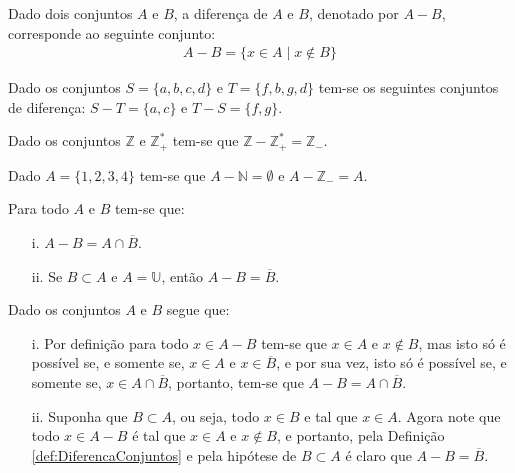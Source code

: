 \begin{definicao}\label{def:DiferencaConjuntos}
	Dado dois conjuntos $A$ e $B$, a diferença de $A$ e $B$, denotado por $A - B$, corresponde ao seguinte conjunto:
  \begin{eqnarray*}
    A - B = \{x \in A \mid x \notin B\}
  \end{eqnarray*}
\end{definicao}

\begin{exemplo}\label{exe:DiferencaConjuntos1}
	Dado os conjuntos $S = \{a, b, c, d\}$ e $T = \{f, b, g, d\}$ tem-se os seguintes conjuntos de diferença: $S - T = \{a, c\}$ e $T - S = \{f, g\}$.
\end{exemplo}

\begin{exemplo}\label{exe:DiferencaConjuntos2}
	Dado os conjuntos $\mathbb{Z}$ e $\mathbb{Z}_+^*$ tem-se que $\mathbb{Z} - \mathbb{Z}_+^* = \mathbb{Z}_-$.
\end{exemplo}

\begin{exemplo}\label{exe:DiferencaConjuntos3}
  Dado $A = \{1, 2, 3, 4\}$ tem-se que $A - \mathbb{N} = \emptyset$ e $A - \mathbb{Z}_{-} = A$. 
\end{exemplo}


\begin{teorema}\label{teo:BasicoDiferencaConjuntos}
	Para todo $A$ e $B$ tem-se que:
	\begin{itemize}
		\item[i.] $A - B = A \cap \overline{B}$.
		\item[ii.] Se $B \subset A$  e $A = \mathbb{U}$, então $A - B = \overline{B}$.
	\end{itemize}
\end{teorema}

\begin{prova}
	Dado os conjuntos $A$ e $B$ segue que:
	\begin{itemize}
		\item[i.] Por definição para todo $x \in A - B$ tem-se que $x \in A$ e $x \notin B$, mas isto só é possível se, e somente se, $x \in A$ e $x \in \overline{B}$, e por sua vez, isto só é possível se, e somente se, $x \in A \cap \overline{B}$, portanto, tem-se que $A - B = A \cap \overline{B}$.
		\item[ii.] Suponha que $B \subset A$, ou seja, todo $x \in B$ e tal que $x \in A$. Agora note que todo $x \in A - B$ é tal que $x \in A$ e $x \notin B$, e portanto, pela Definição \ref{def:DiferencaConjuntos} e pela hipótese de $B \subset A$ é claro que $A - B = \overline{B}$.
	\end{itemize}
\end{prova}


